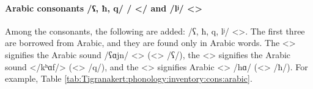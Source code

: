 \paragraph{Arabic consonants /ʕ, ħ, q/ / </ and /lʲ/ <>}\label{section:tigranakert:phono:segment:cons:arabic}


Among the consonants, the following are added: /ʕ, ħ, q, lʲ/ <>. The first three are borrowed from Arabic, and they are found only in Arabic words. The <> signifies the Arabic sound /ʕɑjn/ <> ({<> /ʕ/}), the <> signifies the Arabic sound </kʰɑf/>  ({<> /q/}), and the <> signifies Arabic <> /hɑ/ ({<> /ħ/}). For example, Table \ref{tab:Tigranakert:phonology:inventory:cons:arabic}. 


\begin{table}[H]
	\centering 
	\caption{New consonants /ʕ, ħ, q/ <> from Arabic in the Tigranakert dialect}
	\label{tab:Tigranakert:phonology:inventory:cons:arabic}
\end{table}



